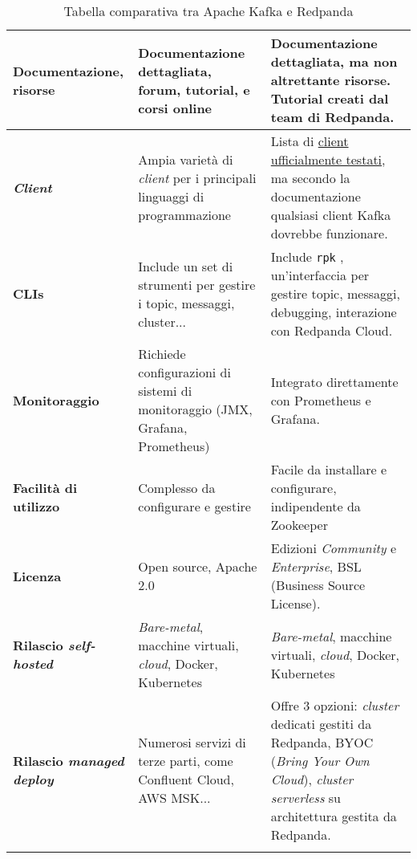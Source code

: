 \begin{longtable}{|p{4cm}||p{5.5cm}|p{5.5cm}|}
	\hline
	\textbf{Documentazione, risorse}          & Documentazione dettagliata, forum, tutorial, e corsi online                   & Documentazione dettagliata, ma non altrettante risorse. Tutorial creati dal team di Redpanda.                                                                                    \\
	\hline
	\textbf{\textit{Client}}                  & Ampia varietà di \textit{client} per i principali linguaggi di programmazione & Lista di \href{https://docs.redpanda.com/current/develop/kafka-clients/}{client ufficialmente testati}, ma secondo la documentazione qualsiasi client Kafka dovrebbe funzionare. \\
	\hline
	\textbf{CLIs}                             & Include un set di strumenti per gestire i topic, messaggi, cluster...         & Include \texttt{rpk} , un'interfaccia per gestire topic, messaggi, debugging, interazione con Redpanda Cloud.                                                                    \\
	\hline
	\textbf{Monitoraggio}                     & Richiede configurazioni di sistemi di monitoraggio (JMX, Grafana, Prometheus) & Integrato direttamente con Prometheus e Grafana.                                                                                                                                 \\
	\hline
	\textbf{Facilità di utilizzo}             & Complesso da configurare e gestire                                            & Facile da installare e configurare, indipendente da Zookeeper                                                                                                                    \\
	\hline
	\textbf{Licenza}                          & Open source, Apache 2.0                                                       & Edizioni \textit{Community} e \textit{Enterprise}, BSL (Business Source License).                                                                                                \\
	\hline
	\textbf{Rilascio \textit{self-hosted}}    & \textit{Bare-metal}, macchine virtuali, \textit{cloud}, Docker, Kubernetes    & \textit{Bare-metal}, macchine virtuali, \textit{cloud}, Docker, Kubernetes                                                                                                       \\
	\hline
	\textbf{Rilascio \textit{managed deploy}} & Numerosi servizi di terze parti, come Confluent Cloud, AWS MSK...             & Offre 3 opzioni: \textit{cluster} dedicati gestiti da Redpanda, BYOC (\textit{Bring Your Own Cloud}), \textit{cluster serverless} su architettura gestita da Redpanda.           \\
	\hline
	\caption{Tabella comparativa tra Apache Kafka e Redpanda}
	\label{table:1}
\end{longtable}







